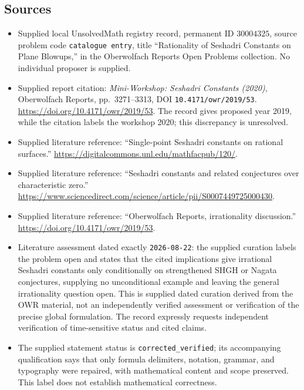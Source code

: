 \documentclass[11pt]{article}
\begin{document}
\subsection{Sources}
\begin{itemize}
\item Supplied local UnsolvedMath registry record, permanent ID \(30004325\), source problem code \texttt{catalogue entry}, title ``Rationality of Seshadri Constants on Plane Blowups,'' in the Oberwolfach Reports Open Problems collection. No individual proposer is supplied.
\item Supplied report citation: \emph{Mini-Workshop: Seshadri Constants (2020)}, Oberwolfach Reports, pp.\ 3271--3313, DOI \texttt{10.4171/owr/2019/53}. \url{https://doi.org/10.4171/owr/2019/53}. The record gives proposed year 2019, while the citation labels the workshop 2020; this discrepancy is unresolved.
\item Supplied literature reference: ``Single-point Seshadri constants on rational surfaces.'' \url{https://digitalcommons.unl.edu/mathfacpub/120/}.
\item Supplied literature reference: ``Seshadri constants and related conjectures over characteristic zero.'' \url{https://www.sciencedirect.com/science/article/pii/S0007449725000430}.
\item Supplied literature reference: ``Oberwolfach Reports, irrationality discussion.'' \url{https://doi.org/10.4171/owr/2019/53}.
\item Literature assessment dated exactly \texttt{2026-08-22}: the supplied curation labels the problem open and states that the cited implications give irrational Seshadri constants only conditionally on strengthened SHGH or Nagata conjectures, supplying no unconditional example and leaving the general irrationality question open. This is supplied dated curation derived from the OWR material, not an independently verified assessment or verification of the precise global formulation. The record expressly requests independent verification of time-sensitive status and cited claims.
\item The supplied statement status is \texttt{corrected\_verified}; its accompanying qualification says that only formula delimiters, notation, grammar, and typography were repaired, with mathematical content and scope preserved. This label does not establish mathematical correctness.
\end{itemize}
\end{document}
